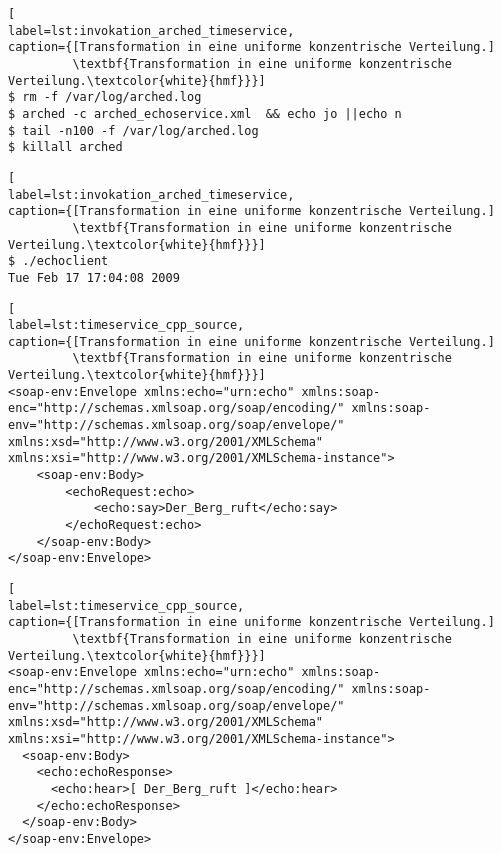 \begin{minipage}[t]{\textwidth}
\begin{lstlisting}[
label=lst:invokation_arched_timeservice,
caption={[Transformation in eine uniforme konzentrische Verteilung.]
         \textbf{Transformation in eine uniforme konzentrische Verteilung.\textcolor{white}{hmf}}}]
$ rm -f /var/log/arched.log
$ arched -c arched_echoservice.xml  && echo jo ||echo n
$ tail -n100 -f /var/log/arched.log
$ killall arched
\end{lstlisting}
\end{minipage}



\begin{minipage}[t]{\textwidth}
\begin{lstlisting}[
label=lst:invokation_arched_timeservice,
caption={[Transformation in eine uniforme konzentrische Verteilung.]
         \textbf{Transformation in eine uniforme konzentrische Verteilung.\textcolor{white}{hmf}}}]
$ ./echoclient
Tue Feb 17 17:04:08 2009
\end{lstlisting}
\end{minipage}





\begin{minipage}[t]{\textwidth}
\begin{lstlisting}[
label=lst:timeservice_cpp_source,
caption={[Transformation in eine uniforme konzentrische Verteilung.]
         \textbf{Transformation in eine uniforme konzentrische Verteilung.\textcolor{white}{hmf}}}]
<soap-env:Envelope xmlns:echo="urn:echo" xmlns:soap-enc="http://schemas.xmlsoap.org/soap/encoding/" xmlns:soap-env="http://schemas.xmlsoap.org/soap/envelope/" xmlns:xsd="http://www.w3.org/2001/XMLSchema" xmlns:xsi="http://www.w3.org/2001/XMLSchema-instance">
	<soap-env:Body>
		<echoRequest:echo>
			<echo:say>Der_Berg_ruft</echo:say>
		</echoRequest:echo>
	</soap-env:Body>
</soap-env:Envelope>
\end{lstlisting}
\end{minipage}


\begin{minipage}[t]{\textwidth}
\begin{lstlisting}[
label=lst:timeservice_cpp_source,
caption={[Transformation in eine uniforme konzentrische Verteilung.]
         \textbf{Transformation in eine uniforme konzentrische Verteilung.\textcolor{white}{hmf}}}]
<soap-env:Envelope xmlns:echo="urn:echo" xmlns:soap-enc="http://schemas.xmlsoap.org/soap/encoding/" xmlns:soap-env="http://schemas.xmlsoap.org/soap/envelope/" xmlns:xsd="http://www.w3.org/2001/XMLSchema" xmlns:xsi="http://www.w3.org/2001/XMLSchema-instance">
  <soap-env:Body>
    <echo:echoResponse>
      <echo:hear>[ Der_Berg_ruft ]</echo:hear>
    </echo:echoResponse>
  </soap-env:Body>
</soap-env:Envelope>
\end{lstlisting}
\end{minipage}

